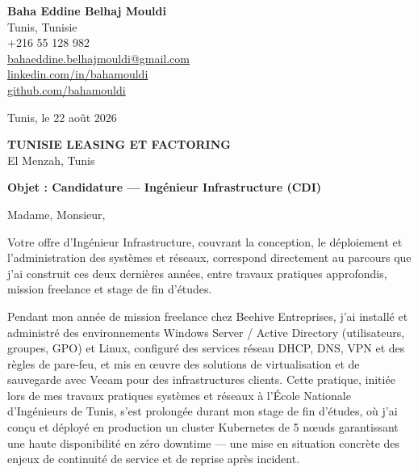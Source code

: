 \documentclass[a4paper,11pt]{article}
\begin{document}
\begin{flushright}
{\bfseries Baha Eddine Belhaj Mouldi}\\
Tunis, Tunisie\\
+216 55 128 982\\
\href{mailto:bahaeddine.belhajmouldi@gmail.com}{bahaeddine.belhajmouldi@gmail.com}\\
\href{https://linkedin.com/in/bahamouldi}{linkedin.com/in/bahamouldi}\\
\href{https://github.com/bahamouldi}{github.com/bahamouldi}
\end{flushright}

\vspace{0.8cm}

\begin{flushleft}
Tunis, le 22 août 2026

\vspace{0.8cm}

{\bfseries TUNISIE LEASING ET FACTORING}\\
El Menzah, Tunis

\vspace{0.6cm}

{\bfseries Objet : Candidature --- Ingénieur Infrastructure (CDI)}
\end{flushleft}

\vspace{0.6cm}

Madame, Monsieur,

Votre offre d'Ingénieur Infrastructure, couvrant la conception, le déploiement et l'administration des systèmes et réseaux, correspond directement au parcours que j'ai construit ces deux dernières années, entre travaux pratiques approfondis, mission freelance et stage de fin d'études.

Pendant mon année de mission freelance chez Beehive Entreprises, j'ai installé et administré des environnements Windows Server / Active Directory (utilisateurs, groupes, GPO) et Linux, configuré des services réseau DHCP, DNS, VPN et des règles de pare-feu, et mis en œuvre des solutions de virtualisation et de sauvegarde avec Veeam pour des infrastructures clients. Cette pratique, initiée lors de mes travaux pratiques systèmes et réseaux à l'École Nationale d'Ingénieurs de Tunis, s'est prolongée durant mon stage de fin d'études, où j'ai conçu et déployé en production un cluster Kubernetes de 5 nœuds garantissant une haute disponibilité en zéro downtime --- une mise en situation concrète des enjeux de continuité de service et de reprise après incident.
\end{document}
